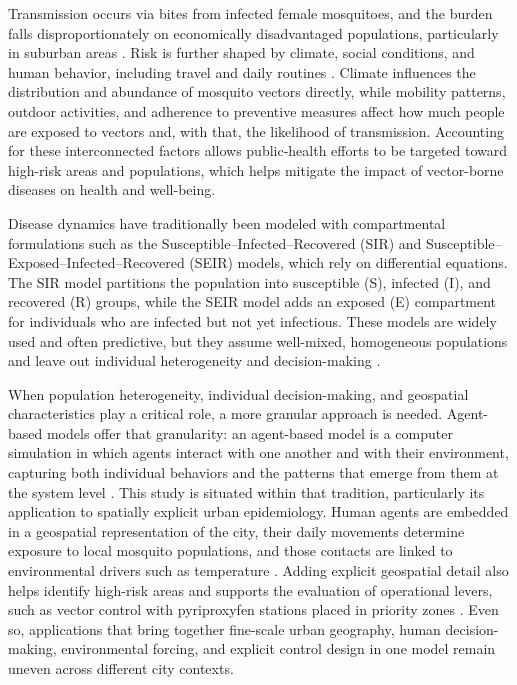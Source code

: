 \documentclass[applsci,article,accept,pdftex,moreauthors]{Definitions/mdpi}
\begin{document}
Transmission occurs via bites from infected female mosquitoes, and the burden falls disproportionately on economically disadvantaged populations, particularly in suburban areas \cite{melo2024integrated}. Risk is further shaped by climate, social conditions, and human behavior, including travel and daily routines \cite{uribe2023ccc}. Climate influences the distribution and abundance of mosquito vectors directly, while mobility patterns, outdoor activities, and adherence to preventive measures affect how much people are exposed to vectors and, with that, the likelihood of transmission. Accounting for these interconnected factors allows public-health efforts to be targeted toward high-risk areas and populations, which helps mitigate the impact of vector-borne diseases on health and well-being.

Disease dynamics have traditionally been modeled with compartmental formulations such as the Susceptible--Infected--Recovered (SIR) and Susceptible--Exposed--Infected--Recovered (SEIR) models, which rely on differential equations. The SIR model partitions the population into susceptible (S), infected (I), and recovered (R) groups, while the SEIR model adds an exposed (E) compartment for individuals who are infected but not yet infectious. These models are widely used and often predictive, but they assume well-mixed, homogeneous populations and leave out individual heterogeneity and decision-making \cite{hunter2022validating}.

When population heterogeneity, individual decision-making, and geospatial characteristics play a critical role, a more granular approach is needed. Agent-based models offer that granularity: an agent-based model is a computer simulation in which agents interact with one another and with their environment, capturing both individual behaviors and the patterns that emerge from them at the system level \cite{antelmi2022experimenting}. This study is situated within that tradition, particularly its application to spatially explicit urban epidemiology. Human agents are embedded in a geospatial representation of the city, their daily movements determine exposure to local mosquito populations, and those contacts are linked to environmental drivers such as temperature \cite{antelmi2022experimenting,uribe2023ccc}. Adding explicit geospatial detail also helps identify high-risk areas and supports the evaluation of operational levers, such as vector control with pyriproxyfen stations placed in priority zones \cite{Ligsay2023Pyriproxyfen}. Even so, applications that bring together fine-scale urban geography, human decision-making, environmental forcing, and explicit control design in one model remain uneven across different city contexts.
\end{document}

